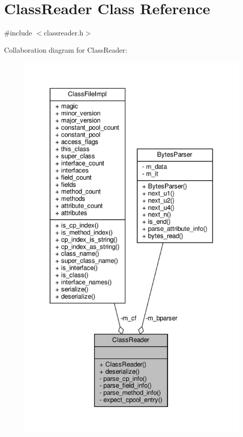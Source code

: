 \hypertarget{classClassReader}{}\section{Class\+Reader Class Reference}
\label{classClassReader}


{\ttfamily \#include $<$classreader.\+h$>$}



Collaboration diagram for Class\+Reader\+:\nopagebreak
\begin{figure}[H]
\begin{center}
\leavevmode
\includegraphics[height=550pt]{classClassReader__coll__graph}
\end{center}
\end{figure}
